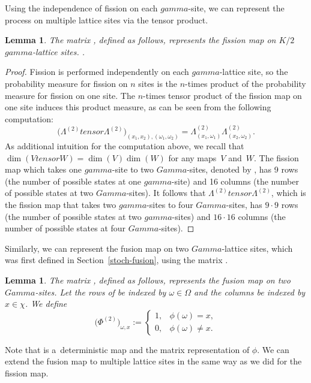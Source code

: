 \documentclass[10pt,a4paper]{amsart}
\numberwithin{equation}{section}
\newtheorem{Lemma}[Theorem]{Lemma}
\theoremstyle{definition}
\def\Gamma{Gamma}
\def\gamma{gamma}
\def\otimes{ tensor }
\begin{document}
Using the independence of fission on each $\gamma$-site, we can represent the process on multiple lattice sites via the tensor product.
\begin{Lemma} The matrix , defined as follows, represents the fission map on $K/2$ $\gamma$-lattice sites.
.
\end{Lemma}
\begin{proof}
 Fission is performed independently on each $\gamma$-lattice site, so the probability measure for fission on $n$ sites is the $n$-times product of the probability measure for fission on one site. The $n$-times tensor product of the fission map on one site induces this product measure, as can be seen from the following computation:
\[
\bigl(\Lambda^{(2)} \otimes \Lambda^{(2)}\bigr)_{(x_1,x_2),(\omega_1,\omega_2)} = \Lambda^{(2)}_{(x_1,\omega_1)}\Lambda^{(2)}_{(x_2,\omega_2)}.
\]
As additional intuition for the computation above, we recall that $\dim(V \otimes W) = \dim(V) \dim(W)$ for any maps~$V$ and~$W$. The fission map which takes one $\gamma$-site to two $\Gamma$-sites, denoted by , has 9 rows (the number of possible states at one $\gamma$-site) and 16 columns (the number of possible states at two $\Gamma$-sites). It follows that
$\Lambda^{(2)} \otimes \Lambda^{(2)}$, which is the fission map that takes two $\gamma$-sites to four $\Gamma$-sites, has $9\cdot 9$ rows (the number of possible states at two $\gamma$-sites) and $16 \cdot 16$ columns (the number of possible states at four $\Gamma$-sites).
\end{proof}

Similarly, we can represent the fusion map on two $\Gamma$-lattice sites, which was first defined in Section~\ref{stoch-fusion}, using the matrix .

\begin{Lemma}\label{PhiTwo}
 The matrix , defined as follows, represents the fusion map on two $\Gamma$-sites.
 Let the rows of  be indexed by $\omega \in \Omega$ and the columns be indexed by $x \in \chi$. We define
 \[
 \bigl(\Phi^{(2)}\bigr)_{\omega, x} :=
 \begin{cases}
 1 ,& \phi(\omega) = x, \\
 0, & \phi(\omega) \neq x.
 \end{cases}
 \]
\end{Lemma}

Note that  is a~deterministic map and the matrix representation of $\phi$.
We can extend the fusion map to multiple lattice sites in the same way as we did for the fission map.
\end{document}
